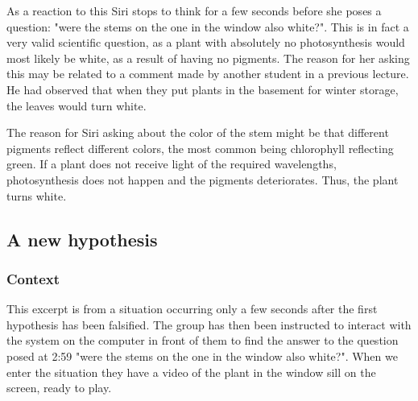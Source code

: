 As a reaction to this Siri stops to think for a few seconds before she poses a question: "were the stems on the one in the window also white?". This is in fact a very valid scientific question, as a plant with absolutely no photosynthesis would most likely be white, as a result of having no pigments. The reason for her asking this may be related to a comment made by another student in a previous lecture. He had observed that when they put plants in the basement for winter storage, the leaves would turn white. 

The reason for Siri asking about the color of the stem might be that different pigments reflect different colors, the most common being chlorophyll reflecting green. If a plant does not receive light of the required wavelengths, photosynthesis does not happen and the pigments deteriorates. Thus, the plant turns white. 
\subsection{A new hypothesis}
\subsubsection*{Context}
This excerpt is from a situation occurring only a few seconds after the first hypothesis has been falsified. The group has then been instructed to interact with the system on the computer in front of them to find the answer to the question posed at 2:59 "were the stems on the one in the window also white?". When we enter the situation they have a video of the plant in the window sill on the screen, ready to play. 

